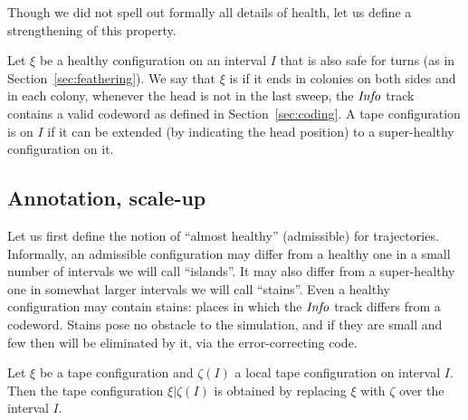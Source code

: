 \documentclass[11pt]{memoir}
\theoremstyle{definition} %
\newcommand{\fld}[1]{\ensuremath{\textit{#1\/}}}
\newcommand{\Info}{\fld{Info}}
\begin{document}
Though we did not spell out formally all details of health, let us define a strengthening of this property.

\begin{definition}\label{def:super-health}
  Let \( \xi  \) be a healthy configuration on an interval \( I \) that is also safe for turns
  (as in Section~\ref{sec:feathering}).
  We say that \( \xi \) is  if it ends in colonies on both sides and
  in each colony, whenever the head is not in the last sweep, the \( \Info \)
  track contains a valid codeword as defined in Section~\ref{sec:coding}.
  A tape configuration is  on \( I \)
  if it can be extended (by indicating the head position) to a super-healthy configuration on it.
\end{definition}



\subsection{Annotation, scale-up}\label{sec:annotation,scale-up}

Let us first define the notion of ``almost healthy'' (admissible) for trajectories.
Informally, an admissible configuration may differ from a healthy one in a small number
of intervals we will call ``islands''.
It may also differ from a super-healthy one in somewhat larger intervals we will call ``stains''.
Even a healthy configuration may contain stains: places in which the \( \Info \) track differs from
a codeword.
Stains pose no obstacle to the simulation, and if they are small and few then
will be eliminated by it, via the error-correcting code.

\begin{definition}
\label{def:local-config}
  Let \( \xi \) be a tape configuration and \( \zeta(I) \) a local
  tape  configuration on interval \( I \).
  Then the tape configuration \( \xi\vert\zeta(I) \) is obtained by
  replacing \( \xi \) with \( \zeta \) over the interval \( I \).
\end{definition}
\end{document}
